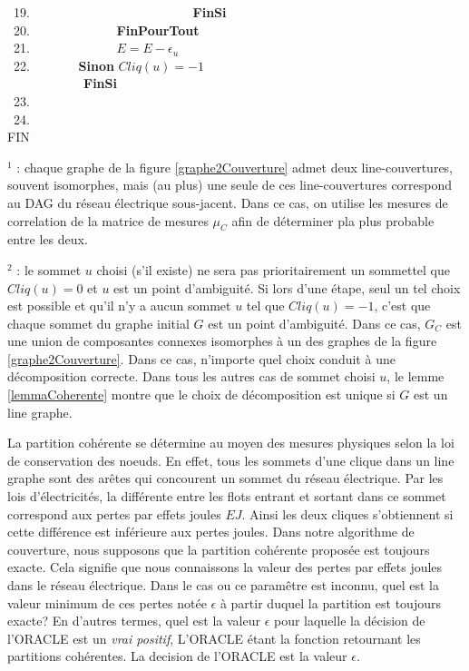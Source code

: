 \begin{algorithm}
~19. 	\indent~~~~~~~~~~~~~~~~~~~~~~~~~{\bf FinSi} \\
~20.		\indent ~~~~~~~~~~~~~{\bf FinPourTout}\\
~21.		\indent ~~~~~~~~~~~~~$E = E - \epsilon_u$\\
~22.		\indent            ~~~~~~~{\bf Sinon} $Cliq(u) = -1$\\
	       	\indent~~~~~~~~~~~~{\bf FinSi}\\
~23. \\
~24. \\
\noindent FIN\\
\end{algorithm}

$^1$ : chaque graphe de la figure \ref{graphe2Couverture} admet deux line-couvertures, souvent isomorphes, mais (au plus) une seule de ces line-couvertures correspond au DAG du r\'eseau \'electrique sous-jacent. Dans ce cas, on utilise les mesures de correlation de la matrice de mesures $\mu_C$ afin de d\'eterminer pla plus probable entre les deux.
\newline

 $^2$ :  le sommet $u$ choisi (s'il existe) ne sera pas prioritairement un sommettel que $Cliq(u) = 0$ et $u$ est un point d'ambiguit\'e. Si lors d'une \'etape, seul un tel choix est possible et qu'il n'y a aucun sommet $u$ tel que $Cliq(u) = -1$, c'est que chaque sommet du graphe initial $G$ est un point d'ambiguit\'e.
 Dans ce cas, $G_C$ est une union de composantes connexes isomorphes \`a un des graphes de la figure  \ref{graphe2Couverture}.
Dans ce cas, n'importe quel choix conduit \`a une d\'ecomposition correcte.
Dans tous les autres cas de sommet choisi $u$, le lemme \ref{lemmaCoherente} montre que le choix de d\'ecomposition est unique si $G$ est un line graphe.
\newline

La partition coh\'erente se d\'etermine au moyen des mesures physiques selon la loi de conservation des noeuds. 
En effet, tous les sommets d'une clique dans un line graphe sont des ar\^etes qui concourent un sommet du r\'eseau \'electrique. 
Par les lois d'\'electricit\'es, la diff\'erente entre les flots entrant et sortant dans ce sommet correspond aux pertes par effets joules $EJ$. 
Ainsi les deux cliques s'obtiennent si cette diff\'erence est inf\'erieure aux pertes joules.
Dans notre algorithme de couverture, nous supposons que la partition coh\'erente propos\'ee est toujours exacte. Cela signifie que nous connaissons la valeur des pertes par effets joules dans le r\'eseau \'electrique. Dans le cas ou ce param\^etre est inconnu, quel est la valeur minimum de ces pertes not\'ee $\epsilon$ \`a partir duquel la partition est toujours exacte?
En d'autres termes, quel est la valeur $\epsilon$ pour laquelle la d\'ecision de l'ORACLE est un {\em vrai positif}, L'ORACLE \'etant la fonction retournant les partitions coh\'erentes. 
La decision de l'ORACLE est la valeur $\epsilon$.

